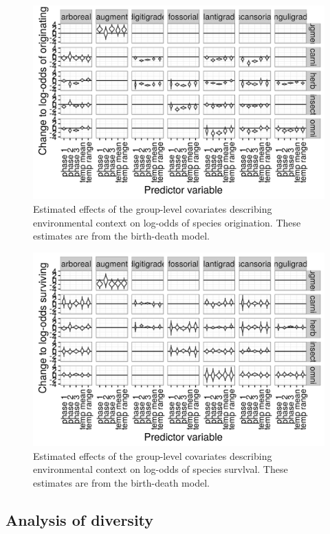 \documentclass[12pt,letterpaper]{article}
\begin{document}
\begin{figure}[ht]
  \centering
  \includegraphics[width=\textwidth,height=0.8\textheight,keepaspectratio=true]{figure/group_on_origin_bd}
  \caption[Effects of group-level covariates on log-odds of ecotype origination as estimated from the the birth-death model]{Estimated effects of the group-level covariates describing environmental context on log-odds of species origination. These estimates are from the birth-death model.}
  \label{fig:group_origin_bd}
\end{figure}

\begin{figure}[ht]
  \centering
  \includegraphics[width=\textwidth,height=0.8\textheight,keepaspectratio=true]{figure/group_on_survival_bd}
  \caption[Effects of group-level covariates on log-odds of ecotype survival as estimated from the the birth-death model]{Estimated effects of the group-level covariates describing environmental context on log-odds of species survlval. These estimates are from the birth-death model.}
  \label{fig:group_surv_bd}
\end{figure}





\subsection*{Analysis of diversity}
\end{document}
